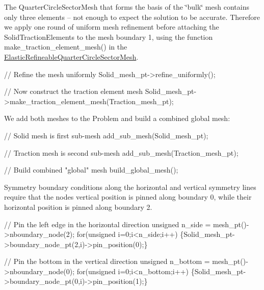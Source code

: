 The {\ttfamily Quarter\+Circle\+Sector\+Mesh} that forms the basis of the \char`\"{}bulk\char`\"{} mesh contains only three elements -- not enough to expect the solution to be accurate. Therefore we apply one round of uniform mesh refinement before attaching the {\ttfamily Solid\+Traction\+Elements} to the mesh boundary 1, using the function {\ttfamily make\+\_\+traction\+\_\+element\+\_\+mesh()} in the {\ttfamily \hyperlink{classElasticRefineableQuarterCircleSectorMesh}{Elastic\+Refineable\+Quarter\+Circle\+Sector\+Mesh}}.


\begin{DoxyCodeInclude}

 \textcolor{comment}{// Refine the mesh uniformly}
 Solid\_mesh\_pt->refine\_uniformly();

 \textcolor{comment}{// Now construct the traction element mesh}
 Solid\_mesh\_pt->make\_traction\_element\_mesh(Traction\_mesh\_pt);

\end{DoxyCodeInclude}


We add both meshes to the {\ttfamily Problem} and build a combined global mesh\+:


\begin{DoxyCodeInclude}
 
 \textcolor{comment}{// Solid mesh is first sub-mesh}
 add\_sub\_mesh(Solid\_mesh\_pt);

 \textcolor{comment}{// Traction mesh is second sub-mesh}
 add\_sub\_mesh(Traction\_mesh\_pt);

 \textcolor{comment}{// Build combined "global" mesh}
 build\_global\_mesh();

\end{DoxyCodeInclude}


Symmetry boundary conditions along the horizontal and vertical symmetry lines require that the nodes\textquotesingle{} vertical position is pinned along boundary 0, while their horizontal position is pinned along boundary 2.


\begin{DoxyCodeInclude}


 \textcolor{comment}{// Pin the left edge in the horizontal direction}
 \textcolor{keywordtype}{unsigned} n\_side = mesh\_pt()->nboundary\_node(2);
 \textcolor{keywordflow}{for}(\textcolor{keywordtype}{unsigned} i=0;i<n\_side;i++)
  \{Solid\_mesh\_pt->boundary\_node\_pt(2,i)->pin\_position(0);\}

 \textcolor{comment}{// Pin the bottom in the vertical direction}
 \textcolor{keywordtype}{unsigned} n\_bottom = mesh\_pt()->nboundary\_node(0);
 \textcolor{keywordflow}{for}(\textcolor{keywordtype}{unsigned} i=0;i<n\_bottom;i++)
  \{Solid\_mesh\_pt->boundary\_node\_pt(0,i)->pin\_position(1);\}

\end{DoxyCodeInclude}


